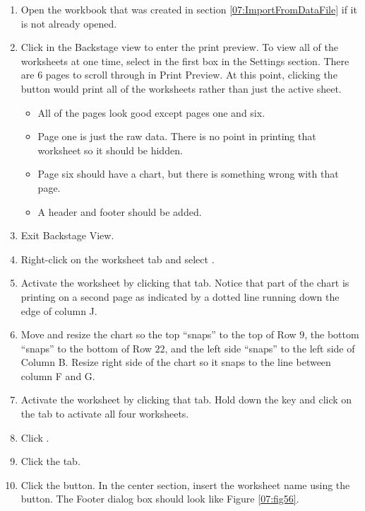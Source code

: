 \begin{enumerate}
	\item Open the  workbook that was created in section \ref{07:ImportFromDataFile} if it is not already opened.
	\item Click  in the Backstage view to enter the print preview. To view all of the worksheets at one time, select  in the first box in the Settings section. There are $ 6 $ pages to scroll through in Print Preview. At this point, clicking the  button would print all of the worksheets rather than just the active sheet.

	\begin{itemize}
		\item All of the pages look good except pages one and six.
		\item Page one is just the raw data. There is no point in printing that worksheet so it should be hidden.
		\item Page six should have a chart, but there is something wrong with that page.
		\item A header and footer should be added.
	\end{itemize}

	\item Exit Backstage View.
	\item Right-click on the  worksheet tab and select .
	\item Activate the  worksheet by clicking that tab. Notice that part of the chart is printing on a second page as indicated by a dotted line running down the edge of column J. 
	\item Move and resize the chart so the top ``snaps'' to the top of Row $ 9 $, the bottom ``snaps'' to the bottom of Row $ 22 $, and the left side ``snaps'' to the left side of Column B. Resize right side of the chart so it snaps to the line between column F and G.
	\item Activate the  worksheet by clicking that tab. Hold down the  key and click on the  tab to activate all four worksheets.
	\item Click .
	\item Click the  tab.
	\item Click the  button. In the center section, insert the worksheet name using the  button. The Footer dialog box should look like Figure \ref{07:fig56}.
\end{enumerate}

